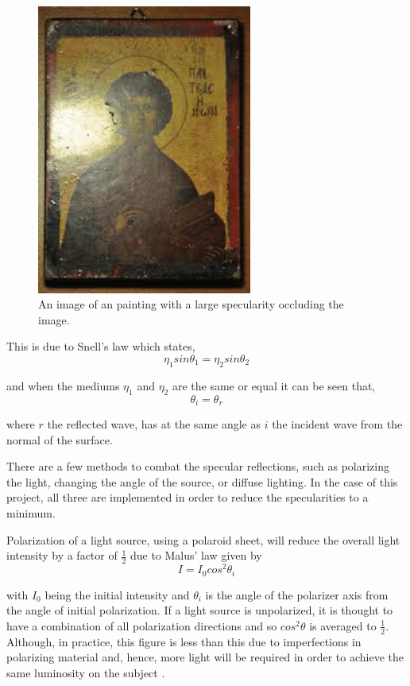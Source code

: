 \documentclass[fleqn,twoside]{article}
\begin{document}
\begin{figure}[h]
	\centering
	\includegraphics[width=200pt]{images/specular_art.jpg}
	\caption{An image of an painting with a large specularity occluding the image.}
	\label{fig:specular_art}
\end{figure}

This is due to Snell's law which states,
\begin{equation}
\eta_{1} sin\theta_{1} = \eta_{2} sin\theta_{2}
\end{equation}

and when the mediums $\eta_{1}$ and  $\eta_{2}$ are the same or equal it can be seen that,
\begin{equation}
\theta_{i} = \theta_{r}
\end{equation}

where $r$ the reflected wave, has at the same angle as $i$ the incident wave from the normal of the surface. 



There are a few methods to combat the specular reflections, such as polarizing the light, changing the angle of the source, or diffuse lighting. In the case of this project, all three are implemented in order to reduce the specularities to a minimum.

Polarization of a light source, using a polaroid sheet, will reduce the overall light intensity by a factor of $\frac{1}{2}$ due to Malus' law given by
\begin{equation}
	I = I_{0} cos^{2}\theta_{i}
\end{equation}

with $I_{0}$ being the initial intensity and $\theta_{i}$ is the angle of the polarizer axis from the angle of initial polarization. If a light source is unpolarized, it is thought to have a combination of all polarization directions and so $cos^{2}\theta$ is averaged to $\frac{1}{2}$. Although, in practice, this figure is less than this due to imperfections in polarizing material and, hence, more light will be required in order to achieve the same luminosity on the subject \cite{rox, sommer}.
\end{document}
